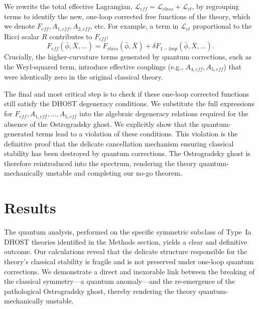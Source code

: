 \documentclass[twocolumn]{aastex631}
\begin{document}
We rewrite the total effective Lagrangian, $\mathcal{L}_{eff} = \mathcal{L}_{class} + \mathcal{L}_{ct}$, by regrouping terms to identify the new, one-loop corrected free functions of the theory, which we denote $F_{eff}, A_{1,eff}, A_{2,eff}$, etc. For example, a term in $\mathcal{L}_{ct}$ proportional to the Ricci scalar $R$ contributes to $F_{eff}$:
\begin{equation}F_{eff}(\bar{\phi}, \bar{X}, \dots) = F_{class}(\bar{\phi}, \bar{X}) + \delta F_{1-loop}(\bar{\phi}, \bar{X}, \dots).\end{equation}
Crucially, the higher-curvature terms generated by quantum corrections, such as the Weyl-squared term, introduce effective couplings (e.g., $A_{4,eff}, A_{5,eff}$) that were identically zero in the original classical theory. \citep{velascoaja2022quantumcorrectionseinsteinsequations,ma2024surprisingeffectivenessweylgravity,fröb2025weylanomalyinteractingquantum}

The final and most critical step is to check if these one-loop corrected functions still satisfy the DHOST degeneracy conditions. We substitute the full expressions for $F_{eff}, A_{1,eff}, \dots, A_{5,eff}$ into the algebraic degeneracy relations required for the absence of the Ostrogradsky ghost. We explicitly show that the quantum-generated terms lead to a violation of these conditions. This violation is the definitive proof that the delicate cancellation mechanism ensuring classical stability has been destroyed by quantum corrections. The Ostrogradsky ghost is therefore reintroduced into the spectrum, rendering the theory quantum-mechanically unstable and completing our no-go theorem.

\section{Results}
\label{sec:results}
The quantum analysis, performed on the specific symmetric subclass of Type~Ia DHOST theories identified in the Methods section, yields a clear and definitive outcome. Our calculations reveal that the delicate structure responsible for the theory's classical stability is fragile and is not preserved under one-loop quantum corrections. We demonstrate a direct and inexorable link between the breaking of the classical symmetry---a quantum anomaly---and the re-emergence of the pathological Ostrogradsky ghost, thereby rendering the theory quantum-mechanically unstable.
\end{document}
